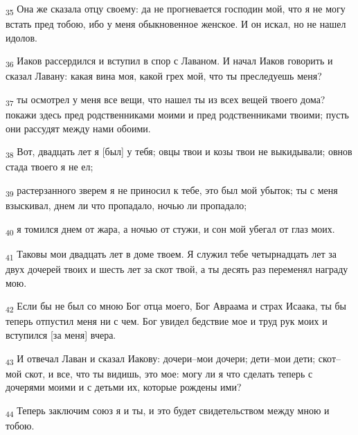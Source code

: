 \begin{tcolorbox}
\textsubscript{35} Она же сказала отцу своему: да не прогневается господин мой, что я не могу встать пред тобою, ибо у меня обыкновенное женское. И он искал, но не нашел идолов.
\end{tcolorbox}
\begin{tcolorbox}
\textsubscript{36} Иаков рассердился и вступил в спор с Лаваном. И начал Иаков говорить и сказал Лавану: какая вина моя, какой грех мой, что ты преследуешь меня?
\end{tcolorbox}
\begin{tcolorbox}
\textsubscript{37} ты осмотрел у меня все вещи, что нашел ты из всех вещей твоего дома? покажи здесь пред родственниками моими и пред родственниками твоими; пусть они рассудят между нами обоими.
\end{tcolorbox}
\begin{tcolorbox}
\textsubscript{38} Вот, двадцать лет я [был] у тебя; овцы твои и козы твои не выкидывали; овнов стада твоего я не ел;
\end{tcolorbox}
\begin{tcolorbox}
\textsubscript{39} растерзанного зверем я не приносил к тебе, это был мой убыток; ты с меня взыскивал, днем ли что пропадало, ночью ли пропадало;
\end{tcolorbox}
\begin{tcolorbox}
\textsubscript{40} я томился днем от жара, а ночью от стужи, и сон мой убегал от глаз моих.
\end{tcolorbox}
\begin{tcolorbox}
\textsubscript{41} Таковы мои двадцать лет в доме твоем. Я служил тебе четырнадцать лет за двух дочерей твоих и шесть лет за скот твой, а ты десять раз переменял награду мою.
\end{tcolorbox}
\begin{tcolorbox}
\textsubscript{42} Если бы не был со мною Бог отца моего, Бог Авраама и страх Исаака, ты бы теперь отпустил меня ни с чем. Бог увидел бедствие мое и труд рук моих и вступился [за меня] вчера.
\end{tcolorbox}
\begin{tcolorbox}
\textsubscript{43} И отвечал Лаван и сказал Иакову: дочери--мои дочери; дети--мои дети; скот--мой скот, и все, что ты видишь, это мое: могу ли я что сделать теперь с дочерями моими и с детьми их, которые рождены ими?
\end{tcolorbox}
\begin{tcolorbox}
\textsubscript{44} Теперь заключим союз я и ты, и это будет свидетельством между мною и тобою.
\end{tcolorbox}
